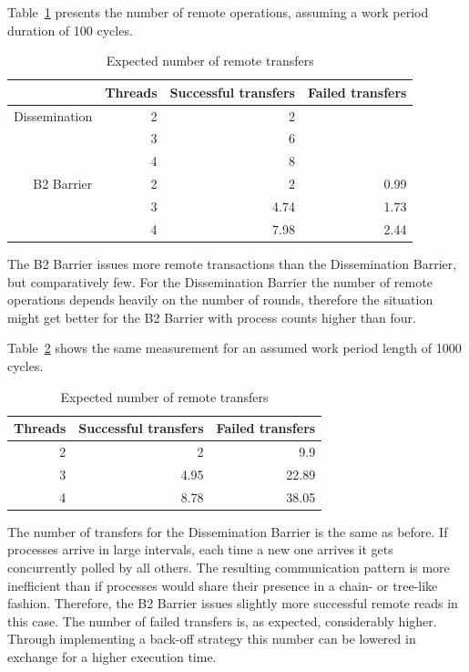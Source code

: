 \documentclass[a4paper, 10pt]{article}
\begin{document}
Table~\ref{tab:d2-transfers-100} presents the number of remote operations, assuming a work period duration of 100 cycles.
\begin{table}[htbp]
	\centering
	\caption{Expected number of remote transfers}
	\vspace{0.2cm}
	\begin{tabular}{r | r | r r}
					  & Threads & Successful transfers & Failed transfers \\
		\hline
		Dissemination & 2       & 2                     &                 \\
					  & 3       & 6                     &                 \\
					  & 4       & 8                     &                 \\
		\hline
		B2 Barrier    & 2       & 2                     & 0.99            \\
					  & 3       & 4.74                  & 1.73            \\
					  & 4       & 7.98                  & 2.44            \\
	\end{tabular}
	\label{tab:d2-transfers-100}
\end{table}
The B2 Barrier issues more remote transactions than the Dissemination Barrier, but comparatively few.
For the Dissemination Barrier the number of remote operations depends heavily on the number of rounds, therefore the situation might get better for the B2 Barrier with process counts higher than four.

Table~\ref{tab:d2-transfers-1000} shows the same measurement for an assumed work period length of 1000 cycles.
\begin{table}[htbp]
	\centering
	\caption{Expected number of remote transfers}
	\vspace{0.2cm}
	\begin{tabular}{r | r r}
		Threads & Successful transfers & Failed transfers \\
		\hline
		2       & 2                     & 9.9             \\
		3       & 4.95                  & 22.89           \\
		4       & 8.78                  & 38.05           \\
	\end{tabular}
	\label{tab:d2-transfers-1000}
\end{table}
The number of transfers for the Dissemination Barrier is the same as before.
If processes arrive in large intervals, each time a new one arrives it gets concurrently polled by all others. The resulting communication pattern is more inefficient than if processes would share their presence in a chain- or tree-like fashion. Therefore, the B2 Barrier issues slightly more successful remote reads in this case.
The number of failed transfers is, as expected, considerably higher.
Through implementing a back-off strategy this number can be lowered in exchange for a higher execution time.
\end{document}

